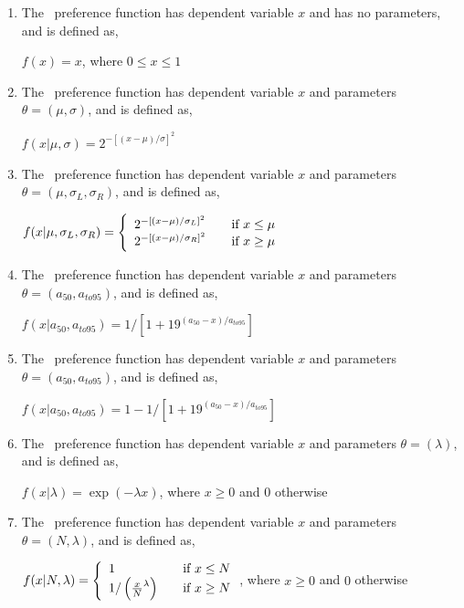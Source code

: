\begin{enumerate}
\item The \ preference function has dependent variable $x$ and has no parameters, and is defined as,

$f(x)=x$, where $0 \leq x \leq 1$

\item The \ preference function has dependent variable $x$ and parameters $\theta = (\mu,\sigma)$, and is defined as, 

$f(x | \mu, \sigma) = 2^{-[(x- \mu)/\sigma ]^2} $
 
\item The \ preference function has dependent variable $x$ and parameters $\theta=(\mu,\sigma_L,\sigma_R)$, and is defined as,

$f(x | \mu, \sigma_L, \sigma_R) = \left\{ 
\begin{array}{l l}
  2^{-[(x- \mu)/\sigma_L ]^2} & \quad \mbox{if $x \leq \mu$}\\
  2^{-[(x- \mu)/\sigma_R ]^2} & \quad \mbox{if $x \ge \mu$}\\
\end{array} \right. $

\item The \ preference function has dependent variable $x$ and parameters $\theta = (a_{50},a_{to95})$, and is defined as,

$f(x | a_{50}, a_{to95}) = 1 / [1+19^{(a_{50}-x)/a_{to95}}]$

\item The \ preference function has dependent variable $x$ and parameters $\theta = (a_{50},a_{to95})$, and is defined as,

$f(x | a_{50}, a_{to95}) =1- 1 / [1+19^{(a_{50}-x)/a_{to95}}]$

\item The \ preference function has dependent variable $x$ and parameters $\theta = (\lambda)$, and is defined as,

$f(x | \lambda) =\exp(-\lambda x)$, where $x \geq 0$ and $0$ otherwise

\item The \ preference function has dependent variable $x$ and parameters $\theta = (N,\lambda)$, and is defined as,

$f(x | N, \lambda) = \left\{ 
\begin{array}{l l}
  1 & \quad \mbox{if $x \leq N$}\\
  1/\left({\frac{x}{N}}^\lambda\right) & \quad \mbox{if $x \ge N$}\\
\end{array} \right. $, where $x \geq 0$ and $0$ otherwise

\end{enumerate}

